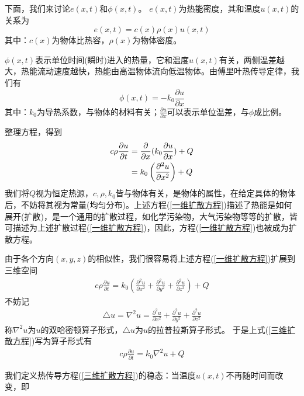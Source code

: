         下面，我们来讨论$e(x,t)$和$\phi(x,t)$。
        $e(x,t)$为热能密度，其和温度$u(x, t)$的关系为
        \[
            e(x,t) = c(x)\rho (x) u(x,t)
        \]
        其中：$c(x)$为物体比热容，$\rho(x)$为物体密度。
        \par
        $\phi (x, t)$表示单位时间(瞬时)进入的热量，它和温度$u(x,t)$有关，两侧温差越大，热能流动速度越快，热能由高温物体流向低温物体。由傅里叶热传导定律，我们有
        \[
            \phi (x,t) = -k_0\frac{\partial u}{\partial x}
        \]
        其中：$k_0$为导热系数，与物体的材料有关；$\frac{\partial u}{\partial x}$可以表示单位温差，与$\phi$成比例。
        \par
        整理方程，得到
        \begin{align}
            \label{一维扩散方程}
            c \rho \frac{\partial u}{\partial t} &= \frac{\partial}{\partial x}(k_0 \frac{\partial u}{\partial x}) + Q \notag\\
            &= k_0\left( \frac{\partial^2 u}{\partial x^2} \right) + Q
        \end{align}
        我们将$Q$视为恒定热源，$c,\rho , k_0$皆与物体有关，是物体的属性，在给定具体的物体后，不妨将其视为常量(均匀分布)。上述方程(\ref{一维扩散方程})描述了热能是如何展开(扩散)，是一个通用的扩散过程，如化学污染物，大气污染物等等的扩散，皆可描述为上述扩散过程(\ref{一维扩散方程})，因此，方程(\ref{一维扩散方程})也被成为扩散方程。
        \par
        由于各个方向$(x,y,z)$的相似性，我们很容易将上述方程(\ref{一维扩散方程})扩展到三维空间
        \begin{align}
            \label{三维扩散方程}
            c \rho \frac{\partial u}{\partial t} = k_0\left( \frac{\partial^2 u}{\partial x^2} + \frac{\partial^2 u}{\partial y^2} + \frac{\partial^2 u}{\partial z^2}\right ) + Q
        \end{align}
        不妨记
        \begin{align*}
            \triangle u = \nabla^2 u = \frac{\partial^2 u}{\partial x^2} + \frac{\partial^2 u}{\partial y^2} + \frac{\partial^2 u}{\partial z^2}
        \end{align*}
        称$\nabla^2 u $为$u$的双哈密顿算子形式，$\triangle u$为$u$的拉普拉斯算子形式。
        于是上式(\ref{三维扩散方程})写为算子形式有
        \begin{align*}
            c \rho \frac{\partial u}{\partial t} = k_0 \nabla^2 u + Q
        \end{align*}
        \par
        我们定义热传导方程(\ref{三维扩散方程})的稳态：当温度$u(x,t)$不再随时间而改变，即
